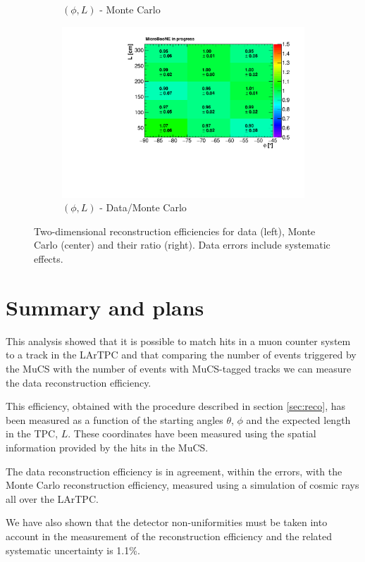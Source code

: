 \documentclass[a4paper]{scrartcl}
\begin{document}
\begin{figure}[htbp]
\begin{subfigure}{0.33\textwidth}
\caption{$(\phi,L)$ - Monte Carlo}
\end{subfigure}\begin{subfigure}{0.33\textwidth}
\includegraphics[width=\linewidth]{figures/phi_l.pdf}
\caption{$(\phi,L)$ - Data/Monte Carlo}
\end{subfigure}
\caption{Two-dimensional reconstruction efficiencies for data (left), Monte Carlo (center) and their ratio (right). Data errors include systematic effects.}\label{fig:2d}
\end{figure}

\section{Summary and plans}
This analysis showed that it is possible to match hits in a muon counter system to a track in the LArTPC and that comparing the number of events triggered by the MuCS with the number of events with MuCS-tagged tracks we can measure the data reconstruction efficiency.

This efficiency, obtained with the procedure described in section \ref{sec:reco}, has been measured as a function of the starting angles $\theta$, $\phi$ and the expected length in the TPC, $L$. These coordinates have been measured using the spatial information provided by the hits in the MuCS.

The data reconstruction efficiency is in agreement, within the errors, with the Monte Carlo reconstruction efficiency, measured using a simulation of cosmic rays all over the LArTPC.

We have also shown that the detector non-uniformities must be taken into account in the measurement of the reconstruction efficiency and the related systematic uncertainty is 1.1\%.
\end{document}
